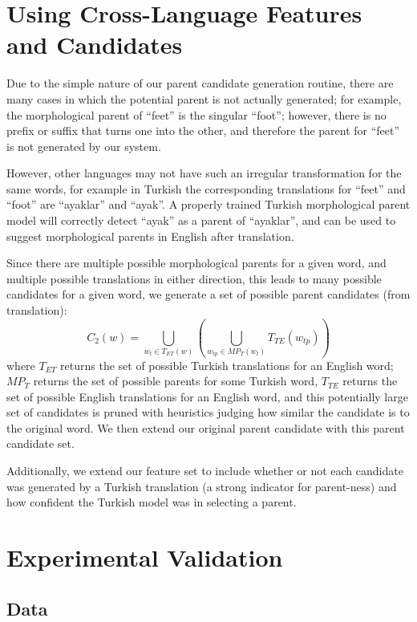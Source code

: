\documentclass[11pt,twocolumn]{article}
\begin{document}
\section{Using Cross-Language Features and Candidates}
Due to the simple nature of our parent candidate generation routine,
there are many cases in which the potential parent is not actually generated;
for example, the morphological parent of ``feet'' is the singular ``foot'';
however, there is no prefix or suffix that turns one into the other, and
therefore the parent for ``feet'' is not generated by our system.

However, other languages may not have such an irregular transformation
for the same words, for example in Turkish the corresponding translations
for ``feet'' and ``foot'' are ``ayaklar'' and ``ayak''. A properly trained Turkish
morphological parent model will correctly detect ``ayak'' as a parent of ``ayaklar'',
and can be used to suggest morphological parents in English after translation.

Since there are multiple possible morphological parents for a given word, and multiple
possible translations in either direction, this leads to many possible candidates for a given word,
we generate a set of possible parent candidates (from translation):
\begin{equation}
    C_2(w) = \bigcup_{w_t \in T_{ET}(w)}\left(\bigcup_{w_{tp} \in MP_T (w_t)} T_{TE}(w_{tp})\right)
\end{equation}
where $T_{ET}$ returns the set of possible Turkish translations
for an English word; $MP_T$ returns the set of possible parents for some Turkish word,
$T_{TE}$ returns the set of possible English translations for an English word,
and this potentially large set of candidates is pruned with heuristics judging
how similar the candidate is to the original word. We then extend our original parent candidate
with this parent candidate set.

Additionally, we extend our feature set to include whether or not each candidate was
generated by a Turkish translation (a strong indicator for parent-ness) and how confident
the Turkish model was in selecting a parent.

\section{Experimental Validation}

\subsection{Data}
\end{document}
